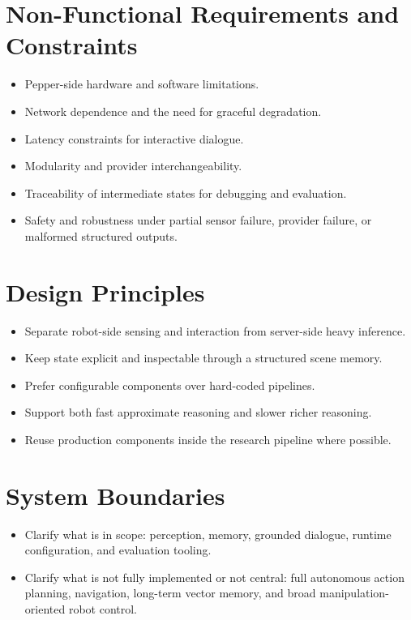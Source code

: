 \documentclass[
  digital,     %
  oneside,     %
  nosansbold,  %
  nocolorbold, %
  lof,         %
  lot,         %
]{fithesis4}
\begin{document}
\section{Non-Functional Requirements and Constraints}
\begin{itemize}
    \item Pepper-side hardware and software limitations.
    \item Network dependence and the need for graceful degradation.
    \item Latency constraints for interactive dialogue.
    \item Modularity and provider interchangeability.
    \item Traceability of intermediate states for debugging and evaluation.
    \item Safety and robustness under partial sensor failure, provider failure, or malformed structured outputs.
\end{itemize}

\section{Design Principles}
\begin{itemize}
    \item Separate robot-side sensing and interaction from server-side heavy inference.
    \item Keep state explicit and inspectable through a structured scene memory.
    \item Prefer configurable components over hard-coded pipelines.
    \item Support both fast approximate reasoning and slower richer reasoning.
    \item Reuse production components inside the research pipeline where possible.
\end{itemize}

\section{System Boundaries}
\begin{itemize}
    \item Clarify what is in scope: perception, memory, grounded dialogue, runtime configuration, and evaluation tooling.
    \item Clarify what is not fully implemented or not central: full autonomous action planning, navigation, long-term vector memory, and broad manipulation-oriented robot control.
\end{itemize}
\end{document}
